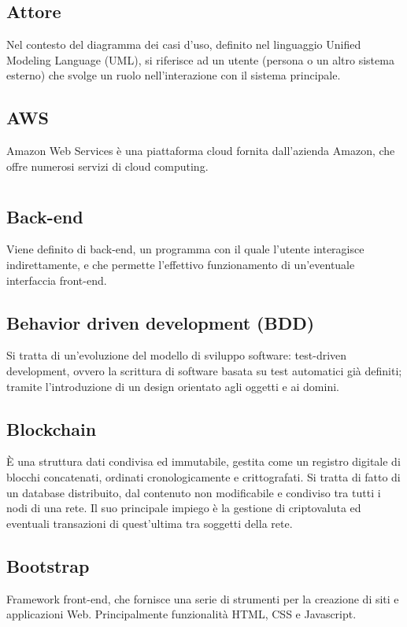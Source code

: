 	\subsection*{Attore}
	Nel contesto del diagramma dei casi d’uso, definito nel linguaggio Unified Modeling Language (UML), si riferisce ad un utente (persona o un altro sistema esterno) che svolge un ruolo nell’interazione con il sistema principale.
	\subsection*{AWS}
	Amazon Web Services è una piattaforma cloud fornita dall’azienda Amazon, che offre numerosi servizi di cloud computing.
\pagebreak
\section[B]{}
	\subsection*{Back-end}
	Viene definito di back-end, un programma con il quale l’utente interagisce indirettamente, e che permette l’effettivo funzionamento di un’eventuale interfaccia front-end.
	\subsection*{Behavior driven development (BDD)}
	Si tratta di un’evoluzione del modello di sviluppo software: test-driven development, ovvero la scrittura di software basata su test automatici già definiti; tramite l’introduzione di un design orientato agli oggetti e ai domini.
	\subsection*{Blockchain}
	È una struttura dati condivisa ed immutabile, gestita come un registro digitale di blocchi concatenati, ordinati cronologicamente e crittografati. Si tratta di fatto di un database distribuito, dal contenuto non modificabile e condiviso tra tutti i nodi di una rete. Il suo principale impiego è la gestione di criptovaluta ed eventuali transazioni di quest’ultima tra soggetti della rete.
	\subsection*{Bootstrap}
	Framework front-end, che fornisce una serie di strumenti per la creazione di siti e applicazioni Web. Principalmente funzionalità HTML, CSS e Javascript.
